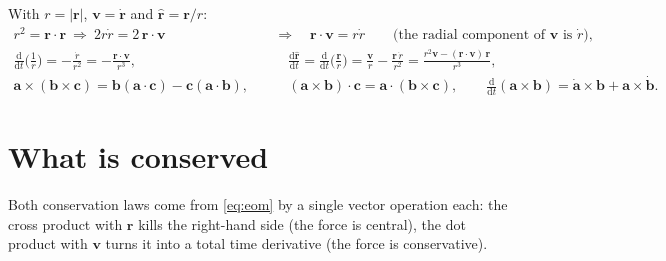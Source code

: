 \documentclass[11pt,letterpaper,oneside]{report}
\newcommand{\dd}{\mathrm{d}}
\newcommand{\bv}[1]{\bm{#1}}
\newcommand{\uv}[1]{\hat{\bm{#1}}}
\begin{document}
\begin{tcolorbox}[enhanced,colback=gray!6,colframe=gray!50,boxrule=0.4pt,fontupper=\small,title={Vector identities used in this chapter},fonttitle=\bfseries\small,left=4pt,right=4pt,top=2pt,bottom=2pt]
With $r=|\bv r|$, $\bv v=\dot{\bv r}$ and $\uv r=\bv r/r$:
\begin{align*}
  r^2=\bv r\cdot\bv r\ \Rightarrow\ 2r\dot r=2\,\bv r\cdot\bv v
  &\quad\Rightarrow\quad \bv r\cdot\bv v=r\dot r \qquad\text{(the radial component of $\bv v$ is $\dot r$)},\\
  \frac{\dd}{\dd t}\Big(\frac1r\Big)=-\frac{\dot r}{r^2}=-\frac{\bv r\cdot\bv v}{r^3},
  &\qquad
  \frac{\dd\uv r}{\dd t}=\frac{\dd}{\dd t}\Big(\frac{\bv r}{r}\Big)=\frac{\bv v}{r}-\frac{\bv r\,\dot r}{r^2}
  =\frac{r^2\bv v-(\bv r\cdot\bv v)\,\bv r}{r^3},\\
  \bv a\times(\bv b\times\bv c)=\bv b(\bv a\cdot\bv c)-\bv c(\bv a\cdot\bv b),
  &\qquad (\bv a\times\bv b)\cdot\bv c=\bv a\cdot(\bv b\times\bv c),\qquad
  \frac{\dd}{\dd t}(\bv a\times\bv b)=\dot{\bv a}\times\bv b+\bv a\times\dot{\bv b}.
\end{align*}
\end{tcolorbox}

\section{What is conserved}\label{sec:conserved}
Both conservation laws come from \cref{eq:eom} by a single vector operation each: the cross
product with $\bv r$ kills the right-hand side (the force is central), the dot product with $\bv v$
turns it into a total time derivative (the force is conservative).
\end{document}

